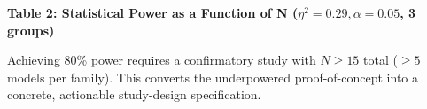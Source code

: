 \textbf{Table 2: Statistical Power as a Function of N ($\eta^{2}=0.29, \alpha =0.05$, 3 groups)}

\begin{table}[htbp]
\centering
{}
\end{table}

Achieving 80\% power requires a confirmatory study with $N\geq 15$ total ($\geq 5$ models per family). This converts the underpowered proof-of-concept into a concrete, actionable study-design specification.


